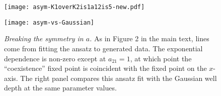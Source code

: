 \iffalse
\begin{figure}[ht]
	\centering
	\begin{minipage}{0.49\linewidth}
		\centering
		\texttt{[image: asym-K1overK2is1a12is5-new.pdf]}
	\end{minipage}
	\begin{minipage}{0.49\linewidth}
		\centering
		\texttt{[image: asym-vs-Gaussian]}
	\end{minipage}
	\centering
	\caption{\emph{Breaking the symmetry in $a$.} As in Figure 2 in the main text, lines come from fitting the ansatz to generated data. The exponential dependence is non-zero except at $a_{21}=1$, at which point the ``coexistence'' fixed point is coincident with the fixed point on the $x$-axis. The right panel compares this ansatz fit with the Gaussian well depth at the same parameter values. } %
	\label{asymmetrica}
\end{figure}%


